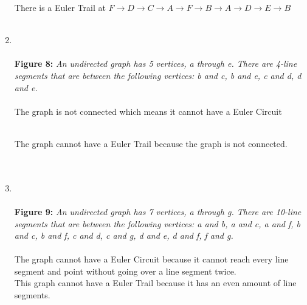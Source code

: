 \begin{enumerate}[label=(\alph*)]
  There is a Euler Trail at $F \to D \to C \to A \to F \to B \to A \to D \to E \to B$
\\\\
   \newpage
\item 
{}
\\\\
{\color{blue} {\bf Figure 8: } \emph{An undirected graph has 5 vertices, a through e. There are 4-line segments that are between the following vertices: b and c, b and e, c and d, d and e. 
  }
}
\\\\
  The graph is not connected which means it cannot have a Euler Circuit
  
  \\
  
  The graph cannot have a Euler Trail because the graph is not connected. \\
  
\\\\

\newpage
\item 
{}
\\\\
{\color{blue} {\bf Figure 9:} \emph{An undirected graph has 7 vertices, a through g. There are 10-line segments that are between the following vertices: a and b, a and c, a and f, b and c, b and f, c and d, c and g, d and e, d and f, f and g. 
  }
}
\\\\
  The graph cannot have a Euler Circuit because it cannot reach every line segment and point without going over a line segment twice. 
  \\
  
  This graph cannot have a Euler Trail because it has an even amount of line segments. \\
  
\\\\


  \end{enumerate}
\newpage
